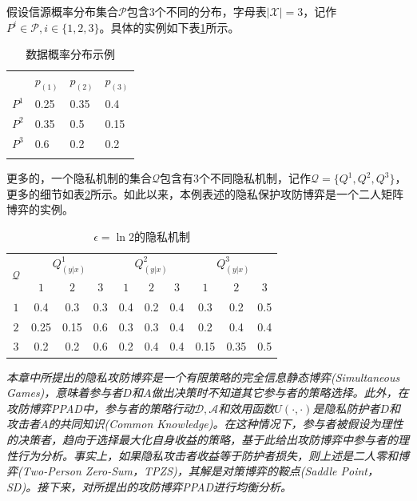 \begin{example}\label{exam:chapter7_02}假设信源概率分布集合$\mathcal{P}$包含$3$个不同的分布，字母表$|\mathcal{X}|=3$，记作$P^i \in \mathcal{P}, i \in \{1,2,3\}$。具体的实例如下表\ref{tab:chapter7_2}所示。

\begin{table}[!ht]
\small
	\centering
	\caption{数据概率分布示例}
	\label{tab:chapter7_2}\centering
	\begin{tabular}{p{1.2cm}p{1.8cm}p{1.8cm}p{1.8cm}}
		\hline\noalign{\smallskip}
		& $p_{(1)}$ & $p_{(2)}$ & $p_{(3)}$  \\
		\noalign{\smallskip}\hline\noalign{\smallskip}
		$P^{1}$ & 0.25 & 0.35 &0.4\\
		$P^{2}$ & 0.35 & 0.5  &0.15\\
		$P^{3}$ & 0.6 & 0.2  &0.2\\
		\noalign{\smallskip}\hline
	\end{tabular}
\end{table}

更多的，一个隐私机制的集合$\mathcal{Q}$包含有$3$个不同隐私机制，记作$\mathcal{Q}=\{Q^1,Q^2,Q^3\}$，更多的细节如表\ref{tab:chapter7_mechanisms}所示。如此以来，本例表述的隐私保护攻防博弈是一个二人矩阵博弈的实例。

\begin{table}[!htb]
\small
\centering
\caption{$\epsilon=\ln2$的隐私机制}
\label{tab:chapter7_mechanisms}
\begin{tabular}{cccccccccc}
\toprule
\multirow{2}{*}{$\mathcal{Q}$} & \multicolumn{3}{c}{$Q^1_{(y|x)}$} & \multicolumn{3}{c}{$Q^2_{(y|x)}$} & \multicolumn{3}{c}{$Q^3_{(y|x)}$} \\
\cmidrule(r){2-4} \cmidrule(r){5-7} \cmidrule(r){8-10}
&  $1$      &  $2$   &   $3$
&  $1$      &  $2$   &   $3$
&  $1$      &  $2$   &   $3$ \\
\midrule
$1$  &0.4  & 0.3 & 0.3   & 0.4  & 0.2   & 0.4  & 0.3    & 0.2   & 0.5  \\
$2$  &0.25   & 0.15  & 0.6 & 0.3  & 0.3  & 0.4  & 0.2  &0.4  & 0.4 \\
$3$ &0.2 & 0.2  & 0.6  & 0.2  & 0.4 & 0.4 & 0.15 & 0.35   & 0.5\\
\bottomrule
\end{tabular}
\end{table}
\end{example}

{\em 本章中所提出的隐私攻防博弈是一个有限策略的完全信息静态博弈(Simultaneous Games)，意味着参与者$D$和$A$做出决策时不知道其它参与者的策略选择。此外，在攻防博弈PPAD中，参与者的策略行动$\mathcal{D},\mathcal{A}$和效用函数$U(\cdot,\cdot)$是隐私防护者$D$和攻击者$A$的共同知识(Common Knowledge)。在这种情况下，参与者被假设为理性的决策者，趋向于选择最大化自身收益的策略，基于此给出攻防博弈中参与者的理性行为分析。事实上，如果隐私攻击者收益等于防护者损失，则上述是二人零和博弈(Two-Person Zero-Sum，TPZS)，其解是对策博弈的鞍点(Saddle Point，SD)。接下来，对所提出的攻防博弈PPAD进行均衡分析。}
